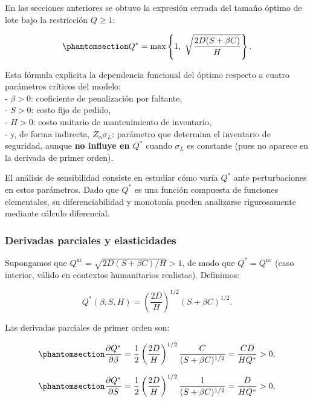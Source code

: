 \documentclass[
  spanish,
  us-letterpaper,
]{scrreprt}
\numberwithin{equation}{section}
\begin{document}
En las secciones anteriores se obtuvo la expresión cerrada del tamaño
óptimo de lote bajo la restricción \(Q \geq 1\):

\begin{equation}\phantomsection\label{eq-Qstar_final}{
Q^* = \max\left\{ 1,\ \sqrt{\frac{2 D (S + \beta C)}{H}} \right\}.
}\end{equation}

Esta fórmula explicita la dependencia funcional del óptimo respecto a
cuatro parámetros críticos del modelo:\\
- \(\beta > 0\): coeficiente de penalización por faltante,\\
- \(S > 0\): costo fijo de pedido,\\
- \(H > 0\): costo unitario de mantenimiento de inventario,\\
- y, de forma indirecta, \(Z_\alpha \sigma_L\): parámetro que determina
el inventario de seguridad, aunque \textbf{no influye en \(Q^*\)} cuando
\(\sigma_L\) es constante (pues no aparece en la derivada de primer
orden).

El análisis de sensibilidad consiste en estudiar cómo varía \(Q^*\) ante
perturbaciones en estos parámetros. Dado que \(Q^*\) es una función
compuesta de funciones elementales, su diferenciabilidad y monotonía
pueden analizarse rigurosamente mediante cálculo diferencial.

\subsubsection{Derivadas parciales y
elasticidades}\label{derivadas-parciales-y-elasticidades}

Supongamos que \(Q^{\text{nc}} = \sqrt{2 D (S + \beta C)/H} > 1\), de
modo que \(Q^* = Q^{\text{nc}}\) (caso interior, válido en contextos
humanitarios realistas). Definimos:

\[
Q^*(\beta, S, H) = \left( \frac{2 D}{H} \right)^{1/2} (S + \beta C)^{1/2}.
\]

Las derivadas parciales de primer orden son:

\begin{equation}\phantomsection\label{eq-dQ_dBeta}{
\frac{\partial Q^*}{\partial \beta} = \frac{1}{2} \left( \frac{2 D}{H} \right)^{1/2} \frac{C}{(S + \beta C)^{1/2}} = \frac{C D}{H Q^*} > 0,
}\end{equation}

\begin{equation}\phantomsection\label{eq-dQ_dS}{
\frac{\partial Q^*}{\partial S} = \frac{1}{2} \left( \frac{2 D}{H} \right)^{1/2} \frac{1}{(S + \beta C)^{1/2}} = \frac{D}{H Q^*} > 0,
}\end{equation}
\end{document}
